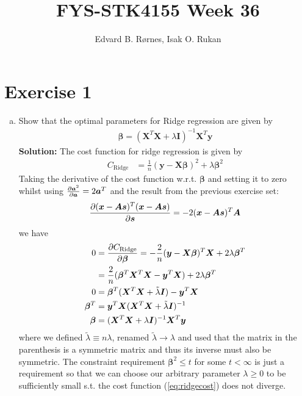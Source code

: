 \documentclass{article}
\title{FYS-STK4155 Week 36}
\author{Edvard B. Rørnes, Isak O. Rukan}
\newcommand{\f}[2]{\frac{#1}{#2}}
\begin{document}
	\maketitle
	\section*{Exercise 1}
	\begin{enumerate}[a)]
		\item Show that the optimal parameters for Ridge regression are given by
		\begin{align}
			\bm{\beta}=(\bm{X}^T\bm{X}+\lambda\bm{I})^{-1}\bm{X}^T\bm{y}
		\end{align}
		\textbf{Solution:}
		The cost function for ridge regression is given by
		\begin{align}
			C_\text{Ridge}&=\frac{1}{n}(\bm{y}-\bm{X}\bm{\beta})^2+\lambda\bm{\beta}^2
			\label{eq:ridgecost}
		\end{align}
		Taking the derivative of the cost function w.r.t. $\bm{\beta}$ and setting it to zero whilst using $\pdv{\bm{a}^2}{\bm{a}}=2\bm{a}^T$ and the result from the previous exercise set:
		\begin{align*}
			\pdv{(\bm{x}-\bm{As})^T(\bm{x}-\bm{As})}{\bm{s}}=-2(\bm{x}-\bm{As})^T\bm{A}
		\end{align*}
		we have
		\begin{align*}
			0&=\pdv{C_\text{Ridge}}{\bm{\beta}}=-\f2n(\bm{y}-\bm{X}\bm{\beta})^T\bm{X}+2\lambda\bm{\beta}^T\\
			&=\f2n(\bm{\beta}^T\bm{X}^T\bm{X}-\bm{y}^T\bm{X})+2\lambda\bm{\beta}^T\\
			0&=\bm{\beta}^T(\bm{X}^T\bm{X}+\tilde{\lambda}\bm{I})-\bm{y}^T\bm{X}\\
			\bm{\beta}^T&=\bm{y}^T\bm{X}(\bm{X}^T\bm{X}+\tilde{\lambda}\bm{I})^{-1}\\
			\bm{\beta}&=(\bm{X}^T\bm{X}+\lambda\bm{I})^{-1}\bm{X}^T\bm{y}
		\end{align*}
		where we defined $\tilde{\lambda}\equiv n\lambda$, renamed $\tilde{\lambda}\to\lambda$ and used that the matrix in the parenthesis is a symmetric matrix and thus its inverse must also be symmetric. The constraint requirement $\bm{\beta}^2\leq t$ for some $t<\infty$ is just a requirement so that we can choose our arbitrary parameter $\lambda\geq0$ to be sufficiently small s.t. the cost function (\ref{eq:ridgecost}) does not diverge.
		

\end{enumerate}
\end{document}
